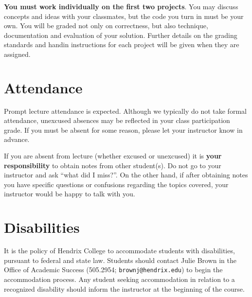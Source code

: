 \documentclass{article}
\begin{document}
\textbf{You must work individually on the first two projects}. You may
discuss concepts and ideas with your classmates, but the code you turn
in must be your own. You will be graded not only on correctness, but
also technique, documentation and evaluation of your solution. Further
details on the grading standards and handin instructions for each
project will be given when they are assigned.


\section*{Attendance}

Prompt lecture attendance is expected.  Although we typically do not
take formal attendance, unexcused absences may be reflected in your
class participation grade.  If you must be absent for some reason,
please let your instructor know in advance.

If you are absent from lecture (whether excused or unexcused) it is
\textbf{your responsibility} to obtain notes from other student(s).
Do not go to your instructor and ask ``what did I miss?''. On the
other hand, if after obtaining notes you have specific questions or
confusions regarding the topics covered, your instructor would be
happy to talk with you.

\section*{Disabilities}

It is the policy of Hendrix College to accommodate students with
disabilities, pursuant to federal and state law. Students should
contact Julie Brown in the Office of Academic Success (505.2954;
\texttt{brownj@hendrix.edu}) to begin the accommodation process. Any
student seeking accommodation in relation to a recognized disability
should inform the instructor at the beginning of the course.
\end{document}
